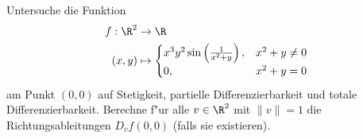 \begin{prob}
Untersuche die Funktion 
\begin{equation*}
        \begin{split}
            f:\R^2&\to\R\\
            (x,y)&\mapsto \begin{cases}
						x^3y^2\sin\left(\frac{1}{x^2+y}\right),& x^2+y\neq 0\\
						0,& x^2+y=0
						\end{cases}
        \end{split}
    \end{equation*}
 am Punkt $(0,0)$ auf Stetigkeit, partielle Differenzierbarkeit und totale Differenzierbarkeit. Berechne f"ur alle $v\in\R^2$ mit $\|v\|=1$ die Richtungsableitungen $D_vf(0,0)$ (falls sie existieren).
\end{prob}

